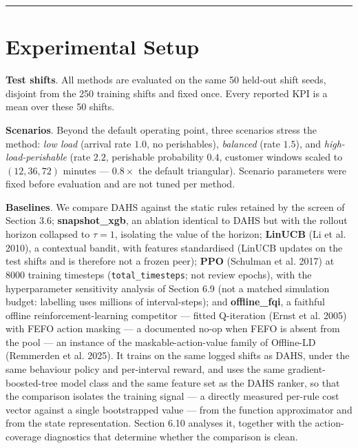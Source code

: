 \documentclass[review,3p,times]{elsarticle}
\theoremstyle{definition}
\begin{document}
\begin{center}\rule{0.5\linewidth}{0.5pt}\end{center}

\section{Experimental Setup}\label{experimental-setup}

\textbf{Test shifts}. All methods are evaluated on the same 50 held-out
shift seeds, disjoint from the 250 training shifts and fixed once. Every
reported KPI is a mean over these 50 shifts.

\textbf{Scenarios}. Beyond the default operating point, three scenarios
stress the method: \emph{low load} (arrival rate \(1.0\), no
perishables), \emph{balanced} (rate \(1.5\)), and
\emph{high-load-perishable} (rate \(2.2\), perishable probability
\(0.4\), customer windows scaled to \((12,36,72)\) minutes ---
\(0.8\times\) the default triangular). Scenario parameters were fixed
before evaluation and are not tuned per method.

\textbf{Baselines}. We compare DAHS against the static rules retained by
the screen of Section 3.6; \textbf{snapshot\_xgb}, an ablation identical
to DAHS but with the rollout horizon collapsed to \(\tau = 1\),
isolating the value of the horizon; \textbf{LinUCB} (Li et al. 2010), a
contextual bandit, with features standardised (LinUCB updates on the
test shifts and is therefore not a frozen peer); \textbf{PPO} (Schulman
et al. 2017) at 8000 training timesteps (\texttt{total\_timesteps}; not
review epochs), with the hyperparameter sensitivity analysis of Section
6.9 (not a matched simulation budget: labelling uses millions of
interval-steps); and \textbf{offline\_fqi}, a faithful offline
reinforcement-learning competitor --- fitted Q-iteration (Ernst et al.
2005) with FEFO action masking --- a documented no-op when FEFO is
absent from the pool --- an instance of the maskable-action-value family
of Offline-LD (Remmerden et al. 2025). It trains on the same logged
shifts as DAHS, under the same behaviour policy and per-interval reward,
and uses the same gradient-boosted-tree model class and the same feature
set as the DAHS ranker, so that the comparison isolates the training
signal --- a directly measured per-rule cost vector against a single
bootstrapped value --- from the function approximator and from the state
representation. Section 6.10 analyses it, together with the
action-coverage diagnostics that determine whether the comparison is
clean.
\end{document}
